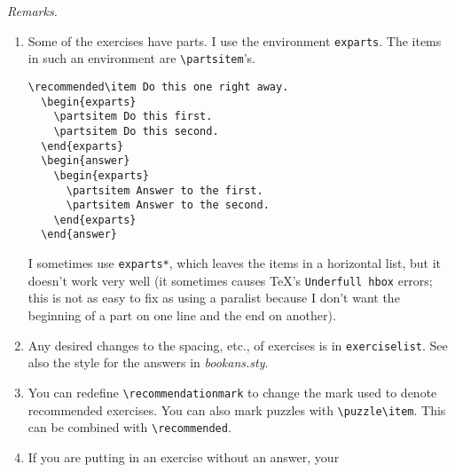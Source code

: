 \documentclass[titlepage]{article}
\begin{document}
\begin{description}
    \textit{Remarks.}
    \begin{enumerate}
      \item 
        Some of the exercises have parts.
        I use the environment \verb|exparts|. 
        The items in such an
        environment are \verb|\partsitem|'s.
\begin{verbatim}
\recommended\item Do this one right away.
  \begin{exparts}
    \partsitem Do this first.
    \partsitem Do this second.
  \end{exparts}
  \begin{answer}
    \begin{exparts}
      \partsitem Answer to the first.
      \partsitem Answer to the second.
    \end{exparts}
  \end{answer}
\end{verbatim}
        I sometimes use \verb|exparts*|, which leaves the items in a 
        horizontal list, but it doesn't work very well (it sometimes
        causes \TeX's \texttt{Underfull hbox} errors; this is not
        as easy to fix as using a paralist because I don't want the
        beginning of a part on one line and the end on another).
      \item
        Any desired changes to the spacing, etc., of exercises is 
        in \verb|exerciselist|.
        See also the style for the answers in \textit{bookans.sty}.
      \item
        You can redefine \verb|\recommendationmark| to change 
        the mark used to denote recommended exercises.
        You can also mark puzzles with \verb!\puzzle\item!.
        This can be combined with \verb!\recommended!.
      \item If you are putting in an exercise without an answer, your

\end{enumerate}
\end{description}
\end{document}
